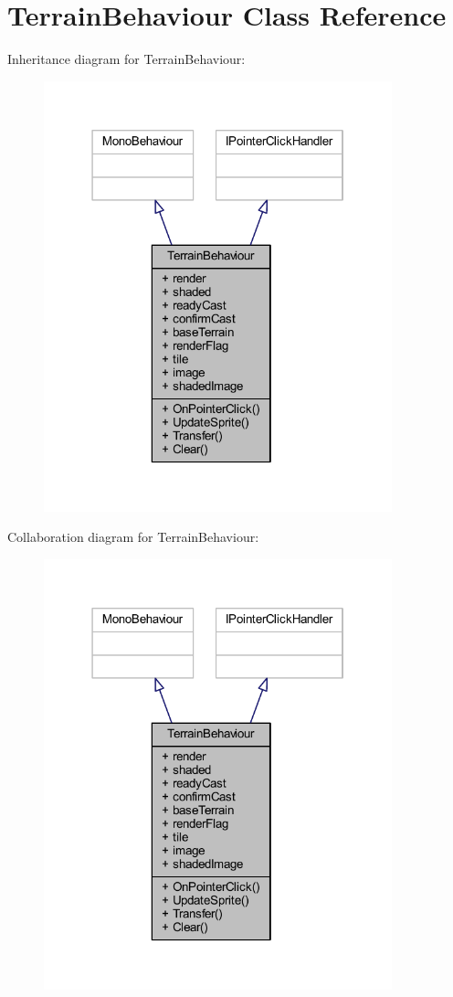\hypertarget{class_terrain_behaviour}{}\section{Terrain\+Behaviour Class Reference}
\label{class_terrain_behaviour}


Inheritance diagram for Terrain\+Behaviour\+:
\nopagebreak
\begin{figure}[H]
\begin{center}
\leavevmode
\includegraphics[width=286pt]{class_terrain_behaviour__inherit__graph}
\end{center}
\end{figure}


Collaboration diagram for Terrain\+Behaviour\+:
\nopagebreak
\begin{figure}[H]
\begin{center}
\leavevmode
\includegraphics[width=286pt]{class_terrain_behaviour__coll__graph}
\end{center}
\end{figure}
